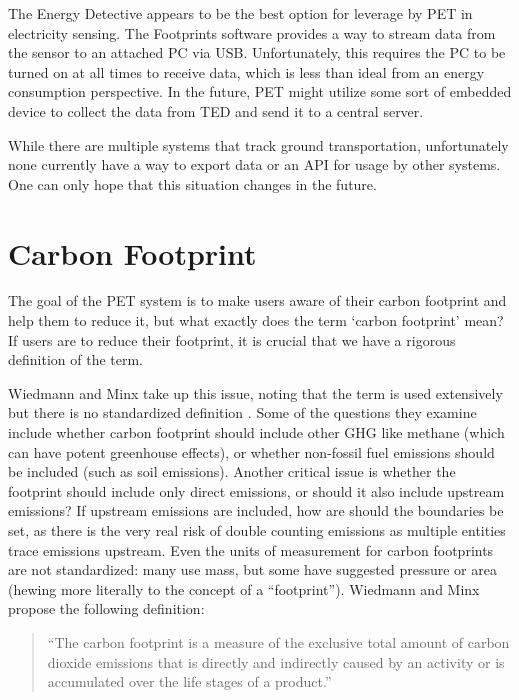 The Energy Detective appears to be the best option for leverage by PET in electricity sensing. The Footprints software provides a way to stream data from the sensor to an attached PC via USB. Unfortunately, this requires the PC to be turned on at all times to receive data, which is less than ideal from an energy consumption perspective. In the future, PET might utilize some sort of embedded device to collect the data from TED and send it to a central server.

While there are multiple systems that track ground transportation, unfortunately none currently have a way to export data or an API for usage by other systems. One can only hope that this situation changes in the future.


\section{Carbon Footprint}

The goal of the PET system is to make users aware of their carbon footprint and help them to reduce it, but what exactly does the term `carbon footprint' mean? If users are to reduce their footprint, it is crucial that we have a rigorous definition of the term.

Wiedmann and Minx take up this issue, noting that the term is used extensively but there is no standardized definition \cite{Wiedmann2007carbon-footprint}. Some of the questions they examine include whether carbon footprint should include other GHG like methane (which can have potent greenhouse effects), or whether non-fossil fuel emissions should be included (such as soil emissions). Another critical issue is whether the footprint should include only direct emissions, or should it also include upstream emissions? If upstream emissions are included, how are should the boundaries be set, as there is the very real risk of double counting emissions as multiple entities trace emissions upstream. Even the units of measurement for carbon footprints are not standardized: many use mass, but some have suggested pressure or area (hewing more literally to the concept of a ``footprint''). Wiedmann and Minx propose the following definition:

\begin{quote}
``The carbon footprint is a measure of the exclusive total amount of carbon dioxide emissions that is directly and indirectly caused by an activity or is accumulated over the life stages of a product.''
\end{quote}

